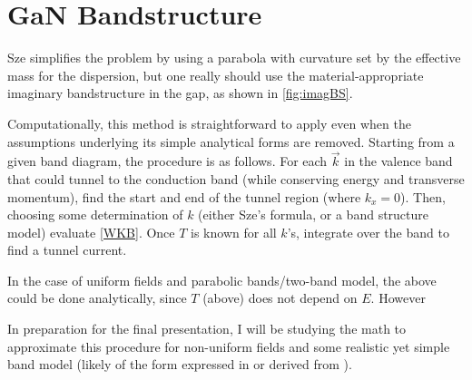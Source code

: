 \section{GaN Bandstructure}
Sze simplifies the problem by using a parabola with curvature set by the effective mass for the dispersion, but one really should use the material-appropriate imaginary bandstructure in the gap, as shown in \ref{fig:imagBS}.




Computationally, this method is straightforward to apply even when the assumptions underlying its simple analytical forms are removed.  Starting from a given band diagram, the procedure is as follows.  For each $\vec{k}$ in the valence band that could tunnel to the conduction band (while conserving energy and transverse momentum), find the start and end of the tunnel region (where $k_x=0$).  Then, choosing some determination of $k$ (either Sze's formula, or a band structure model) evaluate \ref{WKB}.  Once $T$ is known for all $k$'s, integrate over the band to find a tunnel current.



In the case of uniform fields and parabolic bands/two-band model, the above could be done analytically, since $T$ (above) does not depend on $E$.  However


In preparation for the final presentation, I will be studying the math to approximate this procedure for non-uniform fields and some realistic yet simple band model (likely of the form expressed in \cite{Guan_2011} or derived from \cite{Piprek}).